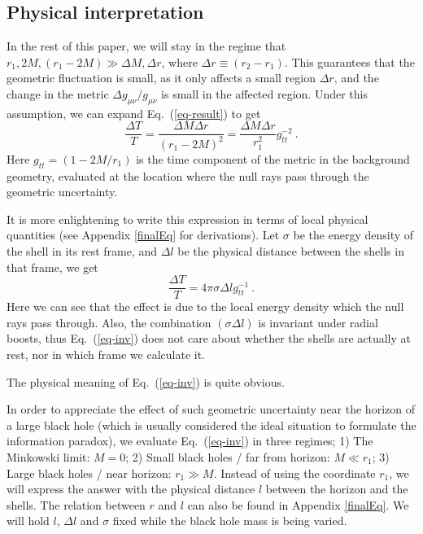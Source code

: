 \documentclass[aps,showpacs,onecolumn,floats,prd,superscriptaddress,nofootinbib]{revtex4-1}
\begin{document}
\subsection{Physical interpretation}

In the rest of this paper, we will stay in the regime that $r_1, 2M, (r_1-2M) \gg \Delta M, \Delta r$, where $\Delta r \equiv(r_2-r_1)$. 
This guarantees that the geometric fluctuation is small, as it only affects a small region $\Delta r$, and the change in the metric $\Delta g_{\mu\nu}/g_{\mu\nu}$ is small in the affected region.
Under this assumption, we can expand Eq.~(\ref{eq-result}) to get 
\begin{equation}
	\frac{\Delta T}{T} = \frac{\Delta M \Delta r}{(r_1-2M)^2} = \frac{\Delta M \Delta r}{r_1^2} g_{tt}^{-2}~.
		\label{lim-result}
\end{equation}
Here $g_{tt}=(1-2M/r_1)$ is the time component of the metric in the background geometry, evaluated at the location where the null rays pass through the geometric uncertainty. 

It is more enlightening to write this expression in terms of local physical quantities (see Appendix \ref{finalEq} for derivations).  Let $\sigma$ be the energy density of the shell in its rest frame, and $\Delta l$ be the physical distance between the shells in that frame, we get
\begin{equation}
	\frac{\Delta T}{T} = 4 \pi \sigma \Delta l g_{tt}^{-1}~.
	\label{eq-inv}
\end{equation}
Here we can see that the effect is due to the local energy density which the null rays pass through.
Also, the combination $(\sigma\Delta l)$ is invariant under radial boosts, thus Eq.~(\ref{eq-inv}) does not care about whether the shells are actually at rest, nor in which frame we calculate it.

The physical meaning of Eq.~(\ref{eq-inv}) is quite obvious. 


In order to appreciate the effect of such geometric uncertainty near the horizon of a large black hole (which is usually considered the ideal situation to formulate the information paradox), we evaluate Eq.~(\ref{eq-inv}) in three regimes; 
1) The Minkowski limit: $M=0$; 
2) Small black holes / far from horizon: $M \ll r_1$; 
3) Large black holes / near horizon: $r_1\gg M$. 
Instead of using the coordinate $r_1$, we will express the answer with the physical distance $l$ between the horizon and the shells. 
The relation between $r$ and $l$ can also be found in Appendix \ref{finalEq}. 
We will hold $l$, $\Delta l$ and $\sigma$ fixed while the black hole mass is being varied.
\end{document}
